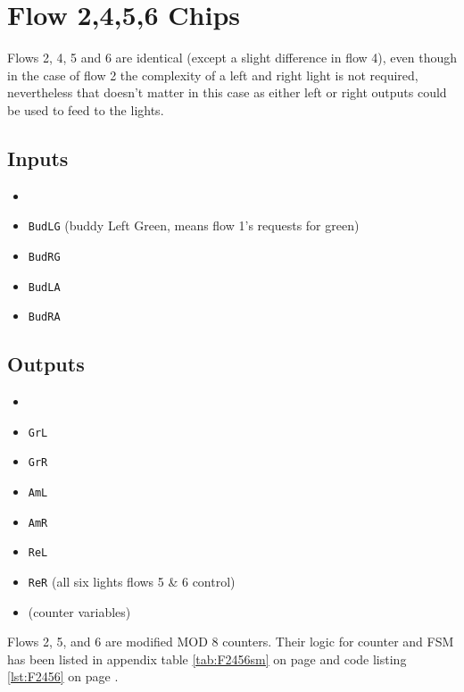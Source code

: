 \section{Flow 2,4,5,6 Chips}
Flows 2, 4, 5 and 6 are identical (except a slight difference in flow 4), even
though in the case of flow 2 the complexity of a left and right light is not
required, nevertheless that doesn't matter in this case as either left or right
outputs could be used to feed to the lights. 

\subsection{Inputs}
\begin{itemize}
  \item \EN
  \item \texttt{BudLG} (buddy Left Green, means flow 1's requests for green)
  \item \texttt{BudRG}
  \item \texttt{BudLA}
  \item \texttt{BudRA}
\end{itemize}

\subsection{Outputs}
\begin{itemize}
  \item \FF
  \item \texttt{GrL}
  \item \texttt{GrR}
  \item \texttt{AmL}
  \item \texttt{AmR}
  \item \texttt{ReL}
  \item \texttt{ReR}  (all six lights flows 5 \& 6 control)
  \item \Q{[0\ldots2]} (counter variables)
\end{itemize}

Flows 2, 5, and 6 are modified MOD 8 counters. Their logic for counter and FSM
has been listed in appendix table \ref{tab:F2456sm} on page \pageref{lst:F2456}
and code listing \ref{lst:F2456} on page \pageref{lst:F2456}.